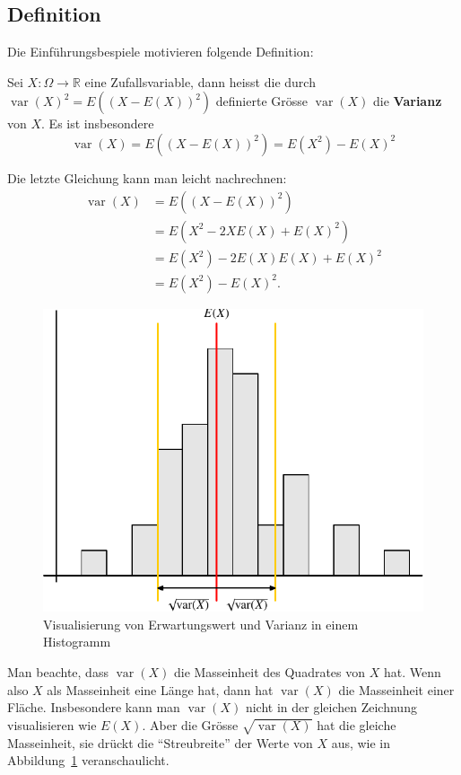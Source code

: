 \subsection{Definition}
Die Einführungsbespiele motivieren folgende Definition:
\begin{definition}
Sei $X\colon\Omega\to\mathbb{R}$ eine Zufallsvariable, dann
heisst die durch $\operatorname{var}(X)^2=E((X-E(X))^2)$ definierte Grösse $\operatorname{var}(X)$ die
{\bf Varianz} von $X$.
Es ist insbesondere
\[
\operatorname{var}(X)=E((X-E(X))^2)=E(X^2)-E(X)^2
\]
\end{definition}
Die letzte Gleichung kann man leicht nachrechnen:
\begin{align*}
\operatorname{var}(X)&=E((X-E(X))^2)\\
&=E(X^2-2XE(X)+E(X)^2)\\
&=E(X^2)-2E(X)E(X)+E(X)^2\\
&=E(X^2)-E(X)^2.
\end{align*}
\begin{figure}
\begin{center}
\includegraphics{images/erwartung-1}
\end{center}
\caption{Visualisierung von Erwartungswert und Varianz in einem Histogramm
\label{histogram}}
\end{figure}%

Man beachte, dass $\operatorname{var}(X)$ die Masseinheit des Quadrates
von $X$ hat.
Wenn also $X$ als Masseinheit eine Länge hat,
dann hat $\operatorname{var}(X)$ die Masseinheit einer Fläche.
Insbesondere kann man $\operatorname{var}(X)$ nicht in der gleichen
Zeichnung visualisieren wie $E(X)$.
Aber die Grösse $\sqrt{\operatorname{var}(X)}$ hat die gleiche Masseinheit, sie
drückt die ``Streubreite'' der Werte von $X$ aus,
wie in Abbildung~\ref{histogram} veranschaulicht.

